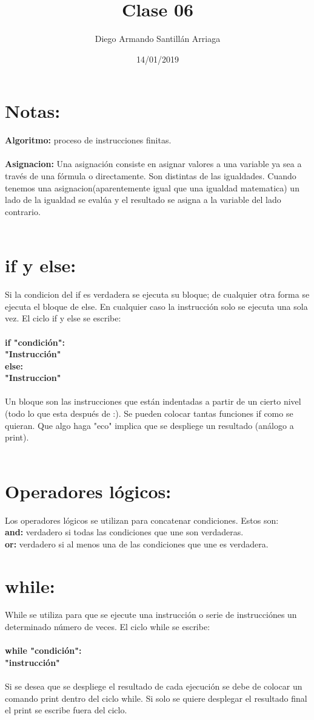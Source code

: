 \documentclass[letter paper, 12pt, oneside]{article}
\title{\Huge Clase 06}
\author{Diego Armando Santillán Arriaga}
\date{14/01/2019}
\begin{document}
	\maketitle
	
\newpage
\section*{Notas:}
\textbf{Algoritmo:} proceso de instrucciones finitas.
\\\\
\textbf{Asignacion:}
Una asignación consiste en asignar valores a una variable ya sea a través de una fórmula o directamente. Son distintas de las igualdades. 
Cuando tenemos una asignacion(aparentemente igual que una igualdad matematica) un lado de la igualdad se evalúa y el resultado se asigna a la variable del lado contrario.
\\\\
\section{if y else:}
Si la condicion del if es verdadera se ejecuta su bloque; de cualquier otra forma se ejecuta el bloque de else. En cualquier caso la instrucción solo se ejecuta una sola vez.
El ciclo if y else se escribe:
\\\\
\textbf{if "condición":
\\
"Instrucción"
\\
else:
\\"Instruccion"}  \\\\ 
Un bloque son las instrucciones que están indentadas a partir de un cierto nivel (todo lo que esta después de :).
Se pueden colocar tantas funciones if como se quieran. 
Que algo haga "eco" implica que se despliege un resultado (análogo a print). 
\\\\
\section{Operadores lógicos:}
Los operadores lógicos se utilizan para concatenar condiciones. Estos son:
\\
\textbf{and:} verdadero si todas las condiciones que une son verdaderas.
\\
\textbf{or:} verdadero si al menos una de las condiciones que une es verdadera. 
\\
\section{while:}
While se utiliza para que se ejecute una instrucción o serie de instrucciónes un determinado número de veces. El ciclo while se escribe:
\\\\
\textbf{while "condición":
\\
"instrucción"}
\\\\
Si se desea que  se despliege el resultado de cada ejecución se debe de colocar un comando print dentro del ciclo while. Si solo se quiere desplegar el resultado final el print se escribe fuera del ciclo.  
\end{document}
